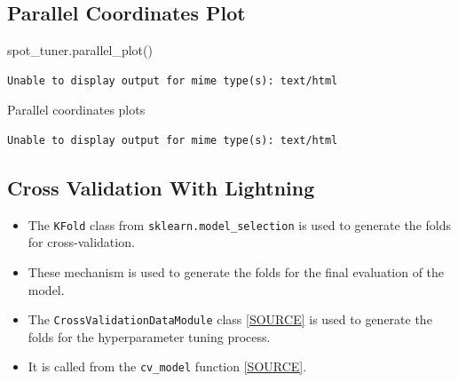 \documentclass[
  letterpaper,
  DIV=11,
  numbers=noendperiod]{scrreprt}
\newenvironment{Shaded}{\begin{snugshade}}{\end{snugshade}}
\newcommand{\NormalTok}[1]{\textcolor[rgb]{0.00,0.23,0.31}{#1}}
\providecommand{\tightlist}{%
  \setlength{\itemsep}{0pt}\setlength{\parskip}{0pt}}\usepackage{longtable,booktabs,array}
\begin{document}
\subsection{Parallel Coordinates
Plot}\label{parallel-coordinates-plot-2}

\begin{Shaded}
\begin{Highlighting}[]
\NormalTok{spot\_tuner.parallel\_plot()}
\end{Highlighting}
\end{Shaded}

\begin{verbatim}
Unable to display output for mime type(s): text/html
\end{verbatim}

Parallel coordinates plots

\begin{verbatim}
Unable to display output for mime type(s): text/html
\end{verbatim}

\subsection{Cross Validation With
Lightning}\label{cross-validation-with-lightning-2}

\begin{itemize}
\tightlist
\item
  The \texttt{KFold} class from \texttt{sklearn.model\_selection} is
  used to generate the folds for cross-validation.
\item
  These mechanism is used to generate the folds for the final evaluation
  of the model.
\item
  The \texttt{CrossValidationDataModule} class
  \href{https://github.com/sequential-parameter-optimization/spotPython/blob/main/src/spotPython/data/lightcrossvalidationdatamodule.py}{{[}SOURCE{]}}
  is used to generate the folds for the hyperparameter tuning process.
\item
  It is called from the \texttt{cv\_model} function
  \href{https://github.com/sequential-parameter-optimization/spotPython/blob/main/src/spotPython/light/cvmodel.py}{{[}SOURCE{]}}.
\end{itemize}
\end{document}
